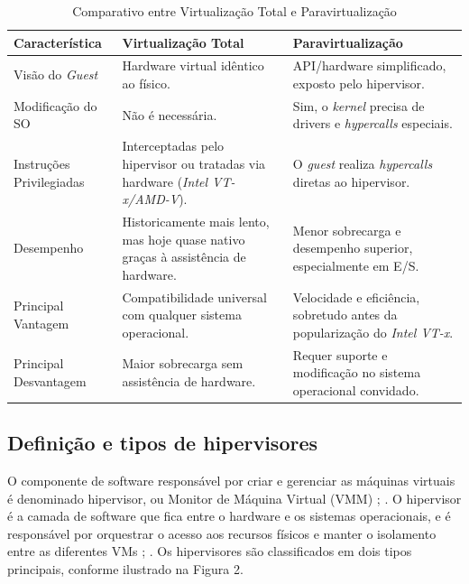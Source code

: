 \begin{table}[h]
    \centering

    \caption{Comparativo entre Virtualização Total e Paravirtualização}
    \label{tab:comparativo_virtualizacao}
    \begin{tabular}{|l|l|l|}
        \hline
        \textbf{Característica} & \textbf{Virtualização Total} & \textbf{Paravirtualização} \\
        \hline
        Visão do \textit{Guest} & Hardware virtual idêntico ao físico. & API/hardware simplificado, exposto pelo hipervisor. \\
        \hline
        Modificação do SO & Não é necessária. & Sim, o \textit{kernel} precisa de drivers e \textit{hypercalls} especiais. \\
        \hline
        Instruções Privilegiadas & Interceptadas pelo hipervisor ou tratadas via hardware (\textit{Intel VT-x/AMD-V}). & O \textit{guest} realiza \textit{hypercalls} diretas ao hipervisor. \\
        \hline
        Desempenho & Historicamente mais lento, mas hoje quase nativo graças à assistência de hardware. & Menor sobrecarga e desempenho superior, especialmente em E/S. \\
        \hline
        Principal Vantagem & Compatibilidade universal com qualquer sistema operacional. & Velocidade e eficiência, sobretudo antes da popularização do \textit{Intel VT-x}. \\
        \hline
        Principal Desvantagem & Maior sobrecarga sem assistência de hardware. & Requer suporte e modificação no sistema operacional convidado. \\
        \hline
    \end{tabular}

\end{table}


\subsection{Definição e tipos de hipervisores}
O componente de software responsável por criar e gerenciar as máquinas virtuais é denominado hipervisor, ou Monitor de Máquina Virtual (VMM) \cite{chawla2025}; \cite{carissimi2008}. O hipervisor é a camada de software que fica entre o hardware e os sistemas operacionais, e é responsável por orquestrar o acesso aos recursos físicos e manter o isolamento entre as diferentes VMs \cite{chawla2025}; \cite{carissimi2008}. Os hipervisores são classificados em dois tipos principais, conforme ilustrado na Figura 2.

